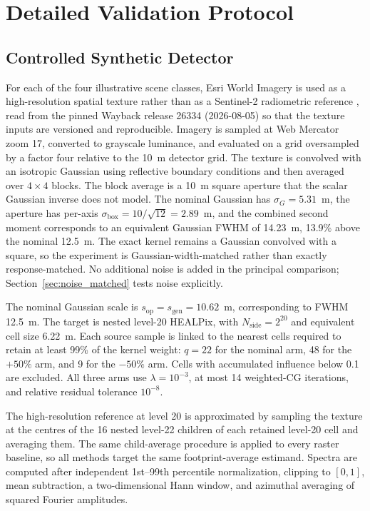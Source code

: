 \documentclass[journal]{IEEEtran}
\newcommand{\healpix}{HEALPix\xspace}
\begin{document}
\section{Detailed Validation Protocol}
\label{supp:protocol}

\subsection{Controlled Synthetic Detector}

For each of the four illustrative scene classes, Esri World Imagery is used
as a high-resolution spatial texture rather than as a Sentinel-2 radiometric
reference \cite{esri_world_imagery}, read from the pinned Wayback release
26334 (2026-08-05) so that the texture inputs are versioned and
reproducible. Imagery is sampled at Web Mercator zoom
17, converted to grayscale luminance, and evaluated on a grid oversampled by
a factor four relative to the 10~m detector grid. The texture is convolved
with an isotropic Gaussian using reflective boundary conditions and then
averaged over $4\times4$ blocks. The block average is a 10~m square aperture
that the scalar Gaussian inverse does not model. The nominal Gaussian has
$\sigma_G=5.31$~m, the aperture has per-axis
$\sigma_{\mathrm{box}}=10/\sqrt{12}=2.89$~m, and the combined second moment
corresponds to an equivalent Gaussian FWHM of 14.23~m, 13.9\% above the
nominal 12.5~m. The exact kernel remains a Gaussian convolved with a square,
so the experiment is Gaussian-width-matched rather than exactly
response-matched. No additional noise is added in the principal comparison;
Section~\ref{sec:noise_matched} tests noise explicitly.

The nominal Gaussian scale is $s_{\mathrm{op}}=s_{\mathrm{gen}}=10.62$~m,
corresponding to FWHM 12.5~m. The target is nested level-20 \healpix, with
$N_{\mathrm{side}}=2^{20}$ and equivalent cell size 6.22~m. Each source
sample is linked to the nearest cells required to retain at least 99\% of the
kernel weight: $q=22$ for the nominal arm, 48 for the $+50\%$ arm, and 9 for
the $-50\%$ arm. Cells with accumulated influence below 0.1 are excluded.
All three arms use $\lambda=10^{-3}$, at most 14 weighted-CG iterations, and
relative residual tolerance $10^{-8}$.

The high-resolution reference at level 20 is approximated by sampling the
texture at the centres of the 16 nested level-22 children of each retained
level-20 cell and averaging them. The same child-average procedure is applied
to every raster baseline, so all methods target the same footprint-average
estimand. Spectra are computed after independent 1st--99th percentile
normalization, clipping to $[0,1]$, mean subtraction, a two-dimensional Hann
window, and azimuthal averaging of squared Fourier amplitudes.
\end{document}
